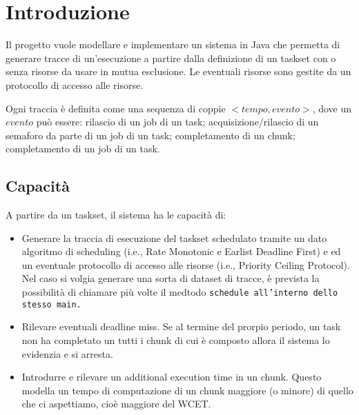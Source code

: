 \chapter{Introduzione}
Il progetto vuole modellare e implementare un sistema in Java che permetta di generare tracce di un'esecuzione a partire dalla definizione di un taskset con o senza risorse da usare in mutua esclusione. Le eventuali risorse sono gestite da un protocollo di accesso alle risorse.

Ogni traccia è definita come una sequenza di coppie $<tempo, evento>$, dove un $evento$ può essere: rilascio di un job di un task; acquisizione/rilascio di un semaforo da parte di un job di un task; completamento di un chunk; completamento di un job di un task.

\section{Capacità}
A partire da un taskset, il sistema ha le capacità di:
\begin{itemize}
    \item Generare la traccia di esecuzione del taskset schedulato tramite un dato algoritmo di scheduling (i.e., Rate Monotonic e Earlist Deadline First) e ed un eventuale protocollo di accesso alle risorse (i.e., Priority Ceiling Protocol). Nel caso si volgia generare una sorta di dataset di tracce, è prevista la possibilità di chiamare più volte il medtodo \texttt{schedule all'interno dello stesso main.}
    \item Rilevare eventuali deadline miss. Se al termine del prorpio periodo, un task non ha completato un tutti i chunk di cui è composto allora il sistema lo evidenzia e si arresta.
    \item Introdurre e rilevare un additional execution time in un chunk. Questo modella un tempo di computazione di un chunk maggiore (o minore) di quello che ci aspettiamo, cioè maggiore del WCET.
\end{itemize}

